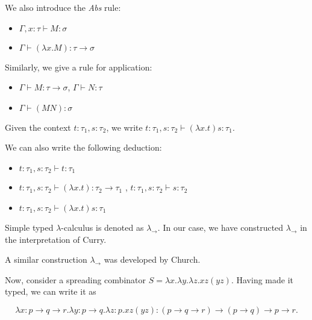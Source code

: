\documentclass[11pt]{scrartcl}
\begin{document}
  We also introduce the \textit{Abs} rule:

  \begin{itemize}
  \item $\Gamma, x:\tau \vdash M:\sigma$
  \item $\Gamma\vdash (\lambda x.M):\tau \to \sigma$
  \end{itemize}

  Similarly, we give a rule for application:

  \begin{itemize}
  \item $\Gamma \vdash M:\tau \to \sigma$, $\Gamma \vdash N:\tau$
  \item $\Gamma \vdash (MN):\sigma$
  \end{itemize}

  \begin{example}

    Given the context $t:\tau_{1}, s:\tau_{2}$, we write
    $t:\tau_{1}, s:\tau_{2} \vdash (\lambda x.t)s:\tau_{1}$.

  \end{example}

  \begin{example}

    We can also write the following deduction:

    \begin{itemize}
    \item $t:\tau_{1}, s:\tau_{2} \vdash t:\tau_{1}$
    \item
      $t:\tau_{1}, s:\tau_{2} \vdash (\lambda x.t):\tau_{2}\to
      \tau_{1}$ , $t:\tau_{1}, s:\tau_{2} \vdash s:\tau_{2}$ 
    \item $t:\tau_{1}, s:\tau_{2} \vdash (\lambda x. t)s:\tau_{1}$
    \end{itemize}

  \end{example}

  Simple typed $\lambda$-calculus is denoted as $\lambda_{\to}$. In
  our case, we have constructed $\lambda_{\to}$ in the interpretation
  of Curry.

  A similar construction $\lambda_{\to}$ was developed by Church.

  Now, consider a spreading combinator
  $S = \lambda x. \lambda y. \lambda z. xz(yz)$. Having made it typed,
  we can write it as
  
  \begin{equation*}
    \lambda x: p \to q \to r. \lambda y: p\to q. \lambda z: p.
    xz(yz):(p\to q \to r) \to (p\to q) \to p \to r.
  \end{equation*}
\end{document}
